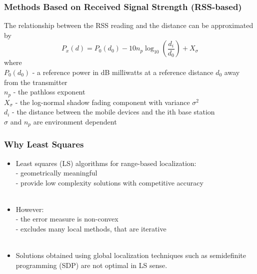 \documentclass [t] {beamer} %
\begin{document}
\begin{frame} %
\frametitle{Methods Based on Received Signal Strength (RSS-based)}
\phantom{m}
The relationship between the RSS reading and the distance can be
approximated by
\begin{equation}
\nonumber
P_x(d) = P_0(d_0) - 10n_p\log_{10}\left( \frac{d_i}{d_0}\right) + X_{\sigma}
\end{equation}
where
\\
$P_0(d_0)$ - a reference power in dB milliwatts at a reference distance $d_0$ away from the transmitter
\\
$n_p$ - the pathloss exponent
\\
$X_{\sigma}$ - the log-normal shadow fading component with variance $\sigma^2$
\\
$d_i$ - the distance between the mobile devices and the ith base station
\\
$\sigma$ and $n_p$ are environment dependent
\end{frame}


\begin{frame} %
\frametitle{Why Least Squares}
\phantom{m}
\begin{itemize}
\item
Least squares (LS) algorithms for range-based localization:\\
- geometrically meaningful\\
- provide low complexity solutions with competitive accuracy
\\~\\
\item
However:\\
- the error measure is non-convex\\
- excludes many local methods, that are iterative
\\~\\
\item
Solutions obtained using global localization techniques such as
semidefinite programming (SDP) are not optimal in LS sense.
\end{itemize}
\end{frame}
\end{document}
